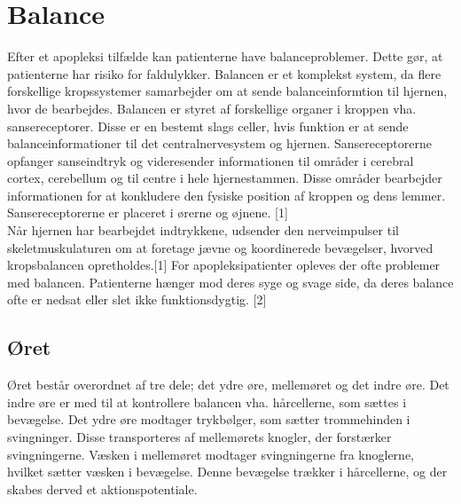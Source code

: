 \section{Balance}
Efter et apopleksi tilfælde kan patienterne have balanceproblemer. Dette gør, at patienterne har risiko for faldulykker. Balancen er et komplekst system, da flere forskellige kropssystemer samarbejder om at sende balanceinformtion til hjernen, hvor de bearbejdes. Balancen er styret af forskellige organer i kroppen vha. sansereceptorer. Disse er en bestemt slags celler, hvis funktion er at sende balanceinformationer til det centralnervesystem og hjernen. Sansereceptorerne opfanger sanseindtryk og videresender informationen til områder i cerebral cortex, cerebellum og til centre i hele hjernestammen. Disse områder bearbejder informationen for at konkludere den fysiske position af kroppen og dens lemmer. Sansereceptorerne er placeret i ørerne og øjnene. [1]\\
Når hjernen har bearbejdet indtrykkene, udsender den nerveimpulser til skeletmuskulaturen om at foretage jævne og koordinerede bevægelser, hvorved kropsbalancen opretholdes.[1] For apopleksipatienter opleves der ofte problemer med balancen. Patienterne hænger mod deres syge og svage side, da deres balance ofte er nedsat eller slet ikke funktionsdygtig. [2]

\subsection{Øret} 

Øret består overordnet af tre dele; det ydre øre, mellemøret og det indre øre. Det indre øre er med til at kontrollere balancen vha. hårcellerne, som sættes i bevægelse. Det ydre øre modtager trykbølger, som sætter trommehinden i svingninger. Disse transporteres af mellemørets knogler, der forstærker svingningerne. Væsken i mellemøret modtager svingningerne fra knoglerne, hvilket sætter væsken i bevægelse. Denne bevægelse trækker i hårcellerne, og der skabes derved et aktionspotentiale.

